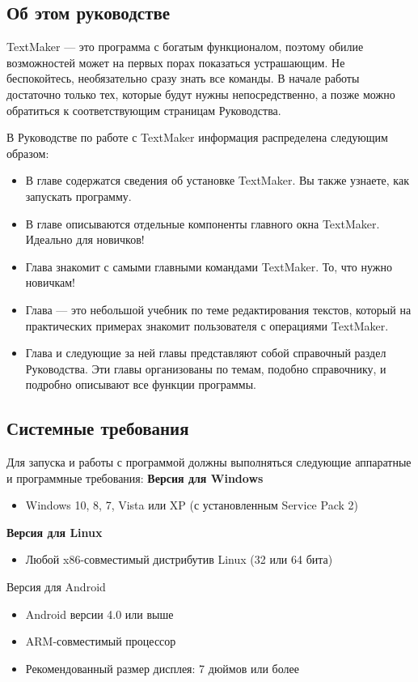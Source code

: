 ﻿\documentclass[a4paper,10pt]{article}
\begin{document}
\subsection{Об этом руководстве}
TextMaker — это программа с богатым функционалом, поэтому обилие возможностей может на первых порах показаться устрашающим. Не беспокойтесь, необязательно сразу знать все команды. В начале работы достаточно только тех, которые будут нужны непосредственно, а позже можно обратиться к соответствующим страницам Руководства.

В Руководстве по работе с TextMaker информация распределена следующим образом:
\begin{itemize}
 \item В главе  содержатся сведения об установке TextMaker.  Вы также узнаете, как запускать программу.
 \item В главе  описываются отдельные компоненты главного окна TextMaker. Идеально для новичков!
 \item Глава  знакомит с самыми главными командами TextMaker. То, что нужно новичкам!
 \item Глава  — это небольшой учебник по теме редактирования текстов, который на практических примерах знакомит пользователя с операциями TextMaker.
 \item Глава  и следующие за ней главы представляют собой справочный раздел Руководства. Эти главы организованы по темам, подобно справочнику, и подробно описывают все функции программы.
\end{itemize}
\subsection{Системные требования}
Для запуска и работы с программой должны выполняться следующие аппаратные и программные требования:
\textbf{Версия для Windows}
\begin{itemize}
 \item Windows 10, 8, 7, Vista или XP (с установленным Service Pack 2)
\end{itemize}
\textbf{Версия для Linux}
\begin{itemize}
 \item Любой x86-совместимый дистрибутив Linux (32 или 64 бита)
\end{itemize}
Версия для Android

\begin{itemize}
 \item Android версии 4.0 или выше
 \item ARM-совместимый процессор
 \item Рекомендованный размер дисплея: 7 дюймов или более
\end{itemize}
\end{document}

